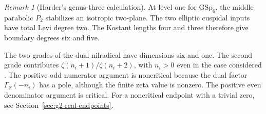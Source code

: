 \documentclass[12pt]{amsart}
\numberwithin{equation}{section}
\theoremstyle{plain}
\theoremstyle{definition}
\theoremstyle{remark}
\newtheorem{remark}[theorem]{Remark}
\newcommand{\R}{\mathbb R}
\newcommand{\GSp}{\mathrm{GSp}}
\begin{document}
\begin{remark}[Harder's genus-three calculation]
At level one for $\GSp_6$, the middle parabolic $P_2$ stabilizes an isotropic two-plane. The two elliptic cuspidal inputs have total Levi degree two. The Kostant lengths four and three therefore give boundary degrees six and five.

The two grades of the dual nilradical have dimensions six and one. The second grade contributes $\zeta(n_i+1)/\zeta(n_i+2)$, with $n_i>0$ even in the case considered \cite[\S9.6.3, pp.~459--461, (9.235), (9.244)--(9.248), (9.252)]{HarderChapterNine}. The positive odd numerator argument is noncritical because the dual factor $\Gamma_\R(-n_i)$ has a pole, although the finite zeta value is nonzero. The positive even denominator argument is critical. For a noncritical endpoint with a trivial zero, see Section~\ref{sec:g2-real-endpoints}.
\end{remark}
\end{document}
